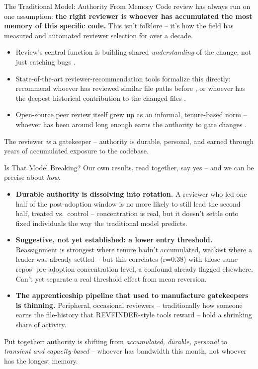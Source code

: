 \begin{frame}{The Traditional Model: Authority From Memory}
Code review has always run on one assumption: \textbf{the right
reviewer is whoever has accumulated the most memory of this specific
code.} This isn't folklore -- it's how the field has measured and
automated reviewer selection for over a decade.
\begin{itemize}
  \item Review's central function is building shared
        \emph{understanding} of the change, not just catching bugs
        \cite{bacchelli2013expectations}.
  \item State-of-the-art reviewer-recommendation tools formalize this
        directly: recommend whoever has reviewed similar file paths
        before \cite{thongtanunam2015revfinder}, or whoever has the
        deepest historical contribution to the changed files
        \cite{zanjani2016chrev}.
  \item Open-source peer review itself grew up as an informal,
        tenure-based norm -- whoever has been around long enough earns
        the authority to gate changes \cite{rigby2008apache}.
\end{itemize}
\vspace{0.3em}
The reviewer \emph{is} a gatekeeper \cite{allen1977gatekeepers} --
authority is durable, personal, and earned through years of
accumulated exposure to the codebase.
\end{frame}

\begin{frame}{Is That Model Breaking?}
Our own results, read together, say yes -- and we can be precise about
\emph{how}.
\begin{itemize}
  \item \textbf{Durable authority is dissolving into rotation.} A
        reviewer who led one half of the post-adoption window is no
        more likely to still lead the second half, treated vs.\
        control -- concentration is real, but it doesn't settle onto
        fixed individuals the way the traditional model predicts.
  \item \textbf{Suggestive, not yet established: a lower entry
        threshold.} Reassignment is strongest where tenure hadn't
        accumulated, weakest where a leader was already settled -- but
        this correlates (r=0.38) with those same repos' pre-adoption
        concentration level, a confound already flagged elsewhere.
        Can't yet separate a real threshold effect from mean reversion.
  \item \textbf{The apprenticeship pipeline that used to manufacture
        gatekeepers is thinning.} Peripheral, occasional reviewers --
        traditionally how someone earns the file-history that
        REVFINDER-style tools reward -- hold a shrinking share of
        activity.
\end{itemize}
\vspace{0.3em}
Put together: authority is shifting from \emph{accumulated, durable,
personal} to \emph{transient and capacity-based} -- whoever has
bandwidth this month, not whoever has the longest memory.
\end{frame}

